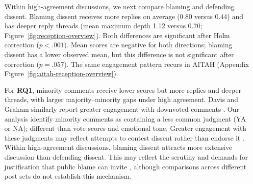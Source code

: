 Within high-agreement discussions, we next compare blaming and defending dissent. Blaming dissent receives more replies on average (0.80 versus 0.44) and has deeper reply threads (mean maximum depth 1.12 versus 0.70; Figure~\ref{fig:reception-overview}). Both differences are significant after Holm correction ($p<.001$). Mean scores are negative for both directions; blaming dissent has a lower observed mean, but this difference is not significant after correction ($p=.057$). 
The same engagement pattern recurs in AITAH (Appendix Figure~\ref{fig:aitah-reception-overview}).

For \textbf{RQ1}, minority comments receive lower scores but more
replies and deeper threads, with larger majority--minority gaps under
high agreement. Davis and Graham similarly report greater engagement
with downvoted comments \cite{davis2021emotional}. Our analysis identify minority comments as containing a less common judgment (YA or NA); different than vote
scores and emotional tone\cite{davis2021emotional}. Greater
engagement with these judgments may reflect attempts to contest dissent rather than endorse it \cite{schachter1951deviation}. Within
high-agreement discussions, blaming dissent attracts more extensive
discussion than defending dissent. This may reflect the scrutiny and
demands for justification that public blame can invite
\cite{malle2022socially}, although comparisons across different post sets
do not establish this mechanism. 



